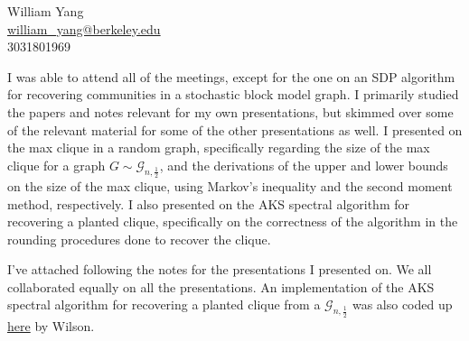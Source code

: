 \documentclass{article}
\begin{document}
William Yang
\\
\href{mailto:william\_yang@berkeley.edu}{william\_yang@berkeley.edu}
\\
3031801969

I was able to attend all of the meetings, except for the one on an SDP
algorithm for recovering communities in a stochastic block model graph. I
primarily studied the papers and notes relevant for my own presentations, but skimmed
over some of the relevant material for some of the other presentations as
well. I presented on the max clique in a random graph, specifically regarding
the size of the max clique for a graph $G \sim \mathcal{G}_{n, \frac{1}{2}}$,
and the derivations of the upper and lower bounds on the size of the max
clique, using Markov's inequality and the second moment method, respectively. I
also presented on the AKS spectral algorithm for recovering a planted clique,
specifically on the correctness of the algorithm in the rounding procedures
done to recover the clique.

I've attached following the notes for the presentations I presented on. We all
collaborated equally on all the presentations. An implementation of the AKS
spectral algorithm for recovering a planted clique from a $\mathcal{G}_{n,
\frac{1}{2}}$ was also coded up
\href{https://github.com/ugtcs/notebooks/blob/master/fa18-bwca/lec3-spectral-planted-clique.ipynb}{here}
by Wilson.
\end{document}
